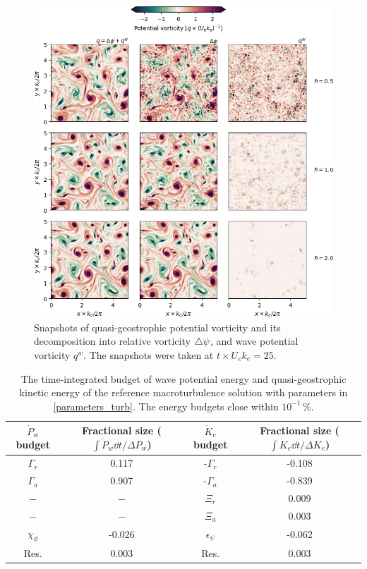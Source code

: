 \documentclass{jfm}
\begin{document}
 \begin{figure}
 \label{pv-terms_turb}
 \centering
 \includegraphics[width=1.\textwidth]{figs/fig5.png}
 \caption{Snapshots of quasi-geostrophic potential vorticity and its
          decomposition into relative vorticity $\triangle\psi$, and wave
          potential vorticity $q^w$. The snapshots were taken at $t\times U_e k_e =25$.
         }
 \end{figure}






 \begin{table}
 \begin{center}
     \caption{The time-integrated budget of wave potential energy and quasi-geostrophic
              kinetic energy of the reference macroturbulence solution with
              parameters in \ref{parameters_turb}. The energy budgets close
              within $10^{-1}\,\%$.\label{table2}}
 \begin{tabular}{c|c|c|c}
 \hline
 $\dot{P}_w$ budget & Fractional size ($\int\dot{P}_w \dd t/\Delta P_w $) & $\dot{K}_e$ budget  & Fractional size ($\int\dot{K}_e \dd t/\Delta K_e$)\\
 \hline
 $\Gamma_r$ & 0.117 & -$\Gamma_r$ & -0.108 \\
 $\Gamma_a$ & 0.907 & -$\Gamma_a$ & -0.839 \\
 $-$ & $-$ & $\Xi_r$ & 0.009 \\
 $-$ & $-$ & $\Xi_a$ & 0.003 \\
 $\chi_\phi$ & -0.026 & $\epsilon_\psi$ & -0.062 \\
 Res. & 0.003 & Res. & 0.003 \\
 \end{tabular}
 \end{center}
 \end{table}
\end{document}
